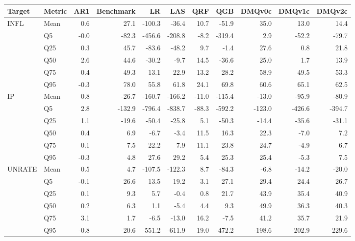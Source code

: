 \begin{tabular}{llrrrrrrrrr}
\toprule
Target & Metric & AR1 & Benchmark & LR & LAS & QRF & QGB & DMQv0c & DMQv1c & DMQv2c \\
\midrule
\multirow{6}{*}{INFL} & Mean & 0.6 & 27.1 & -100.3 & -36.4 & 10.7 & -51.9 & 35.0 & 13.0 & 14.4 \\
 & Q5 & -0.0 & -82.3 & -456.6 & -208.8 & -8.2 & -319.4 & 2.9 & -52.2 & -79.7 \\
 & Q25 & 0.3 & 45.7 & -83.6 & -48.2 & 9.7 & -1.4 & 27.6 & 0.8 & 21.8 \\
 & Q50 & 2.6 & 44.6 & -30.2 & -9.7 & 14.5 & -36.6 & 25.0 & 1.7 & 13.9 \\
 & Q75 & 0.4 & 49.3 & 13.1 & 22.9 & 13.2 & 28.2 & 58.9 & 49.5 & 53.3 \\
 & Q95 & -0.3 & 78.0 & 55.8 & 61.8 & 24.1 & 69.8 & 60.6 & 65.1 & 62.5 \\
\midrule
\multirow{6}{*}{IP} & Mean & 0.8 & -26.7 & -160.7 & -166.2 & -11.0 & -115.4 & -13.0 & -95.9 & -80.9 \\
 & Q5 & 2.8 & -132.9 & -796.4 & -838.7 & -88.3 & -592.2 & -123.0 & -426.6 & -394.7 \\
 & Q25 & 1.1 & -19.6 & -50.4 & -25.8 & 5.1 & -50.3 & -14.4 & -35.6 & -31.1 \\
 & Q50 & 0.4 & 6.9 & -6.7 & -3.4 & 11.5 & 16.3 & 22.3 & -7.0 & 7.2 \\
 & Q75 & 0.1 & 7.5 & 22.2 & 7.9 & 11.1 & 23.8 & 24.7 & -4.9 & 6.7 \\
 & Q95 & -0.3 & 4.8 & 27.6 & 29.2 & 5.4 & 25.3 & 25.4 & -5.3 & 7.5 \\
\midrule
\multirow{6}{*}{UNRATE} & Mean & 0.5 & 4.7 & -107.5 & -122.3 & 8.7 & -84.3 & -6.8 & -14.2 & -20.0 \\
 & Q5 & -0.1 & 26.6 & 13.5 & 19.2 & 3.1 & 27.1 & 29.4 & 24.4 & 26.7 \\
 & Q25 & 0.1 & 9.3 & 5.7 & -0.4 & 0.8 & 21.7 & 43.9 & 35.4 & 40.9 \\
 & Q50 & 0.2 & 6.3 & 1.1 & -5.4 & 4.4 & 9.3 & 49.9 & 36.3 & 40.3 \\
 & Q75 & 3.1 & 1.7 & -6.5 & -13.0 & 16.2 & -7.5 & 41.2 & 35.7 & 21.9 \\
 & Q95 & -0.8 & -20.6 & -551.2 & -611.9 & 19.0 & -472.2 & -198.6 & -202.9 & -229.6 \\
\bottomrule
\end{tabular}

